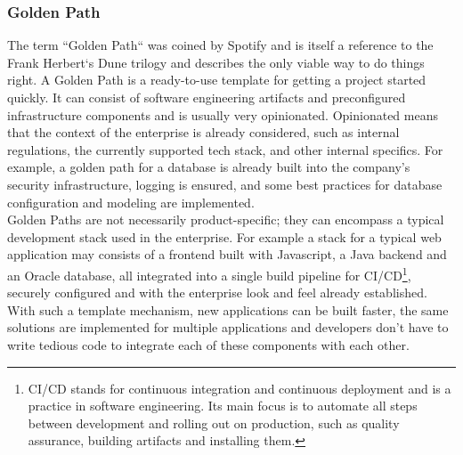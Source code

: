 \documentclass[a4paper,12pt]{article}
\begin{document}
    \subsubsection{Golden Path}
    \label{sssec:goldenpath}
    The term ``Golden Path`` was coined by Spotify\parencite{spotifygoldenpath} and is itself a reference to the Frank
    Herbert`s Dune trilogy and describes the only viable way to do things right.
    A Golden Path is a ready-to-use template for getting a project started quickly.
    It can consist of software engineering artifacts and preconfigured infrastructure components and is usually very
    opinionated.
    Opinionated means that the context of the enterprise is already considered, such as internal regulations,
    the currently supported tech stack, and other internal specifics.
    For example, a golden path for a database is already built into the company's security infrastructure,
    logging is ensured, and some best practices for database configuration and modeling are implemented.\\
    Golden Paths are not necessarily product-specific; they can encompass a typical development stack used in the enterprise.
    For example a stack for a typical web application may consists of a frontend built with Javascript, a Java backend
    and an Oracle database, all integrated into a single build pipeline for CI/CD\footnote{CI/CD stands for continuous
    integration and continuous deployment and is a practice in software engineering. Its main focus is to automate all steps
    between development and rolling out on production, such as quality assurance, building artifacts and installing them.},
    securely configured and with the enterprise look and feel already established.
    With such a template mechanism, new applications can be built faster, the same solutions are implemented for multiple
    applications and developers don't have to write tedious code to integrate each of these components with each other.
\end{document}
